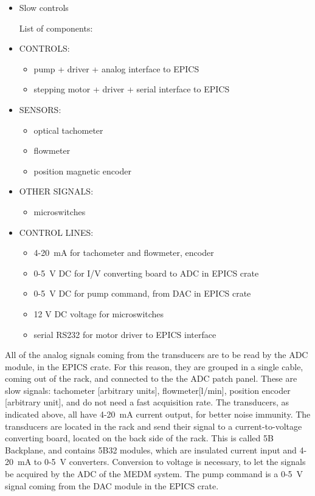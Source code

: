 \begin{itemize}
\item Slow controls 


List of components: 

\item CONTROLS: 

\begin{itemize}
\item pump + driver + analog interface to EPICS 
\item stepping motor + driver + serial interface to EPICS 
\end{itemize}
\end{itemize}
\begin{itemize}
\item SENSORS: 

\begin{itemize}
\item optical tachometer 
\item flowmeter 
\item position magnetic encoder 
\end{itemize}
\item OTHER SIGNALS: 

\begin{itemize}
\item microswitches 
\end{itemize}
\item CONTROL LINES: 

\begin{itemize}
\item 4-20~mA for tachometer and flowmeter, encoder 
\item 0-5~V DC for I/V converting board to ADC in EPICS crate 
\item 0-5~V DC for pump command, from DAC in EPICS crate 
\item 12 V DC voltage for microswitches 
\item serial RS232 for motor driver to EPICS interface 
\end{itemize}
\end{itemize}
All of the analog signals coming from the transducers are to be read
by the ADC module, in the EPICS crate. For this reason, they are grouped
in a single cable, coming out of the rack, and connected to the the
ADC patch panel. These are slow signals: tachometer {[}arbitrary units{]},
flowmeter{[}l/min{]}, position encoder {[}arbitrary unit{]}, and do
not need a fast acquisition rate. The transducers, as indicated above,
all have 4-20~mA current output, for better noise immunity. The transducers
are located in the rack and send their signal to a current-to-voltage
converting board, located on the back side of the rack. This is called
5B Backplane, and contains 5B32 modules, which are insulated current
input and 4-20~mA to 0-5~V converters. Conversion to voltage is
necessary, to let the signals be acquired by the ADC of the MEDM system.
The pump command is a 0-5~V signal coming from the DAC module in
the EPICS crate.


